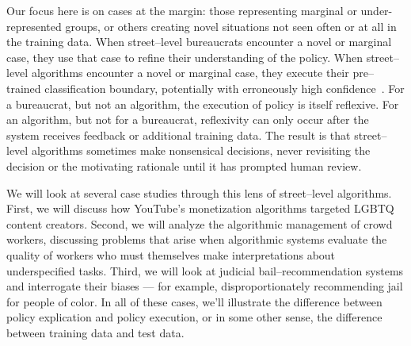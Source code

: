 \documentclass[street-level_algorithms]{subfiles}
\begin{document}
Our focus here is on cases at the margin: those representing
marginal or under-represented groups, or
others creating novel situations not seen often or at all in the training data.
When street--level bureaucrats encounter a novel or marginal case,
they use that case to refine their understanding of the policy.
When street--level algorithms encounter a novel or marginal case,
they execute their pre--trained classification boundary,
potentially with erroneously high confidence~\cite{attenberg2011beat}.
For a bureaucrat, but not an algorithm, the execution of policy is itself reflexive.
For an algorithm, but not for a bureaucrat, reflexivity can only occur after the system receives feedback or additional training data.
The result is that street--level algorithms sometimes make nonsensical decisions,
never revisiting the decision or the motivating rationale until it has prompted human review.

We will look at several case studies through this lens of street--level algorithms.
First, we will discuss how YouTube's monetization algorithms targeted LGBTQ content creators.
Second,
we will analyze the algorithmic management of crowd workers,
discussing problems that arise when algorithmic systems evaluate the quality of workers
who must themselves make interpretations about underspecified tasks.
Third, we will look at judicial bail--recommendation systems and interrogate their biases
--- for example, disproportionately recommending jail for people of color.
In all of these cases,
we'll illustrate the difference between policy explication and policy execution, or
in some other sense, the difference between training data and test data.
\end{document}

